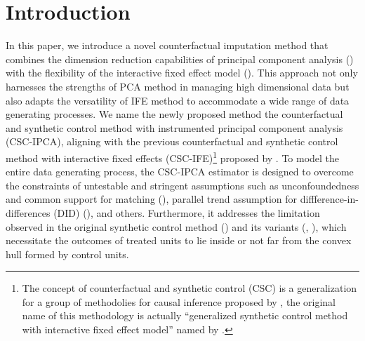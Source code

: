 \documentclass[12pt]{article}
\begin{document}
\doublespacing

\section{Introduction} 
\label{sec:introduction}
In this paper, we introduce a novel counterfactual imputation method that combines the dimension reduction capabilities of principal component analysis (\cite{jollife2016principal}) with the flexibility of the interactive fixed effect model (\cite{bai2003computation,bai2009panel}). This approach not only harnesses the strengths of PCA method in managing high dimensional data but also adapts the versatility of IFE method to accommodate a wide range of data generating processes. We name the newly proposed method the counterfactual and synthetic control method with instrumented principal component analysis (CSC-IPCA), aligning with the previous counterfactual and synthetic control method with interactive fixed effects (CSC-IFE)\footnote{The concept of counterfactual and synthetic control (CSC) is a generalization for a group of methodolies for causal inference proposed by \cite{chernozhukov2021exact}, the original name of this methodology is actually ``generalized synthetic control method with interactive fixed effect model'' named by \cite{xu2017generalized}.} proposed by \cite{xu2017generalized}. To model the entire data generating process, the CSC-IPCA estimator is designed to overcome the constraints of untestable and stringent assumptions such as unconfoundedness and common support for matching (\cite{abadie2011bias, abadie2006large}), parallel trend assumption for diffference-in-differences (DID) (\cite{card1993minimum}), and others. Furthermore, it addresses the limitation observed in the original synthetic control method (\cite{abadie2010synthetic}) and its variants (\cite{ben2021augmented}, \cite{arkhangelsky2021synthetic}), which necessitate the outcomes of treated units to lie inside or not far from the convex hull formed by control units. 
\end{document}
